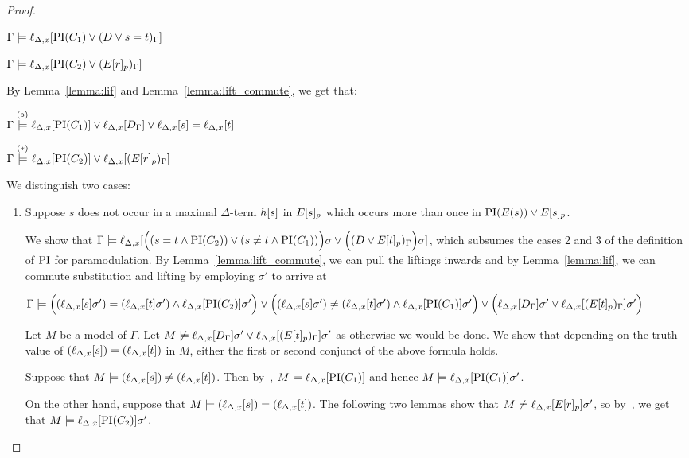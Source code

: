 \documentclass[,%
	paper=a4,%
	DIV14, 
	liststotoc,
	bibtotoc,
	draft=false,%
	numbers=noendperiod
]{scrartcl}
\newcommand{\lif}[1]{\lift{\Delta}{#1}{x}}
\begin{document}
\begin{proof}
\begin{description}
			$\Gamma \entails \lif{\PI(C_1) \lor (D\lor s=t)_\Gamma}$

			$\Gamma \entails \lif{\PI(C_2) \lor (E\occurat{r}{p})_\Gamma}$

			By Lemma~\ref{lemma:lif} and Lemma~\ref{lemma:lift_commute}, we get that:

			$\Gamma \stackrel{\markA}\entails \lif{\PI(C_1)} \lor \lif{D_\Gamma} \lor \lif{s} = \lif{t}$

			$\Gamma \stackrel{\markB}\entails \lif{\PI(C_2)} \lor \lif{(E\occurat{r}{p})_\Gamma}$

			We distinguish two cases:\nopagebreak
			\begin{enumerate}
				\item Suppose $s$ does not occur in a maximal $\Delta$-term $h[s]$ in $E{[s]_{p}}$ which occurs more than once in $\operatorname{PI}(E(s)) \lor E{[s]_{p}}$.

					We show that $\Gamma \entails \lif{ \Big((s=t \land \PI(C_2)) \lor (s\neq t \land \PI(C_1))\Big)\sigma \lor \Big((D \lor E\occurat{t}{p})_\Gamma\Big)\sigma}$, which subsumes the cases 2 and 3 of the definition of $\operatorname{PI}$ for paramodulation.
					By Lemma~\ref{lemma:lift_commute}, we can pull the liftings inwards and by Lemma~\ref{lemma:lif}, we can commute substitution and lifting by employing $\sigma'$ to arrive at

				$\Gamma \entails
				\Big((\lif{s}\sigma')=(\lif{t}\sigma') \land \lif{\PI(C_2)}\sigma'\Big) \lor
				\Big((\lif{s}\sigma')\neq(\lif{t}\sigma') \land \lif{\PI(C_1)}\sigma'\Big) \lor
				\Big(\lif{D_\Gamma}\sigma' \lor \lif{(E\occurat{t}{p})_\Gamma}\sigma'\Big)$

				Let $M$ be a model of $\Gamma$. Let $M \notentails \lif{D_\Gamma}\sigma' \lor \lif{(E\occurat{t}{p})_\Gamma}\sigma'$ as otherwise we would be done. We show that depending on the truth value of  $(\lif{s}) = (\lif{t})$ in $M$, either the first or second conjunct of the above formula holds.

				Suppose that $M \entails (\lif{s}) \neq (\lif{t})$. 
				Then by~\markA, $M \entails \lif{\PI(C_1)}$ and hence $M \entails \lif{\PI(C_1)}\sigma'$.

				On the other hand, suppose that $M \entails (\lif{s}) = (\lif{t})$.
				The following two lemmas show that $M \notentails \lif{E\occurat{r}{p}}\sigma'$, so by~\markB, we get that $M\entails \lif{\PI(C_2)}\sigma'$.
\bigskip


\end{enumerate}
\end{description}
\end{proof}
\end{document}
